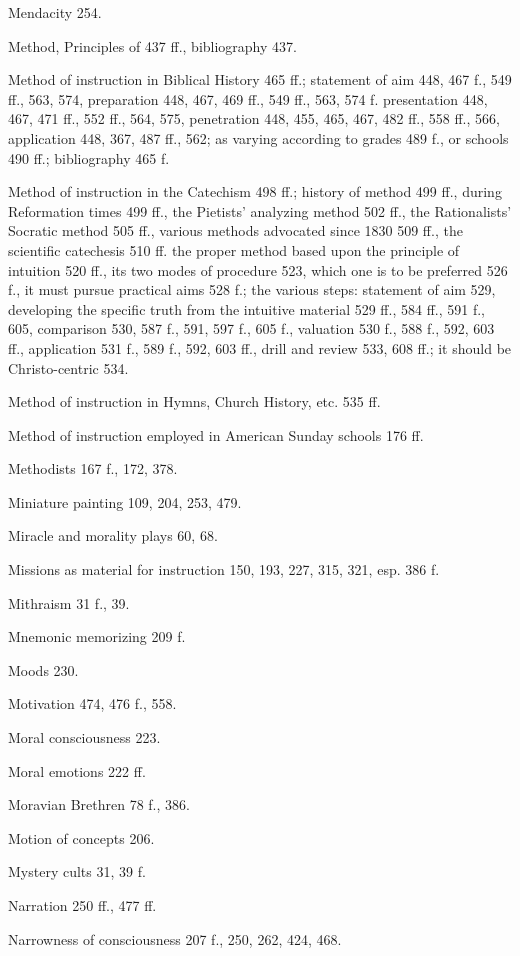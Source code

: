 Mendacity 254.

Method, Principles of 437 ff., bibliography 437.

Method of instruction in Biblical History 465 ff.; statement of aim 448, 467 f., 549 ff., 563, 574, preparation 448, 467, 469 ff., 549 ff., 563, 574 f. presentation 448, 467, 471 ff., 552 ff., 564, 575, penetration 448, 455, 465, 467, 482 ff., 558 ff., 566, application 448, 367, 487 ff., 562; as varying according to grades 489 f., or schools 490 ff.; bibliography 465 f.

Method of instruction in the Catechism 498 ff.; history of method 499 ff., during Reformation times 499 ff., the Pietists’ analyzing method 502 ff., the Rationalists’ Socratic method 505 ff., various methods advocated since 1830 509 ff., the scientific catechesis 510 ff.
the proper method based upon the principle of intuition 520 ff., its two modes of procedure 523, which one is to be preferred 526 f., it must pursue practical aims 528 f.; the various steps: statement of aim 529, developing the specific truth from the intuitive material 529 ff., 584 ff., 591 f., 605, comparison 530, 587 f., 591, 597 f., 605 f., valuation 530 f., 588 f., 592, 603 ff., application 531 f., 589 f., 592, 603 ff., drill and review 533, 608 ff.; it should be Christo-centric 534.

Method of instruction in Hymns, Church History, etc. 535 ff.

Method of instruction employed in American Sunday schools 176 ff.

Methodists 167 f., 172, 378.

Miniature painting 109, 204, 253, 479.

Miracle and morality plays 60, 68.

Missions as material for instruction 150, 193, 227, 315, 321, esp. 386 f.

Mithraism 31 f., 39.

Mnemonic memorizing 209 f.

Moods 230.

Motivation 474, 476 f., 558.

Moral consciousness 223.

Moral emotions 222 ff.

Moravian Brethren 78 f., 386.

Motion of concepts 206.

Mystery cults 31, 39 f.

Narration 250 ff., 477 ff.

Narrowness of consciousness 207 f., 250, 262, 424, 468.

